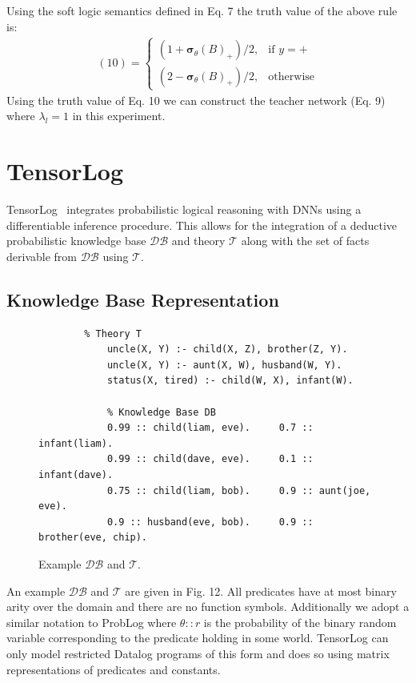 \documentclass[11pt]{article}
\begin{document}
Using the soft logic semantics defined in Eq. 7 the truth value of the above rule is:
\begin{gather*}
(10) = 
\begin{cases}
(1 + \boldsymbol{\sigma}_\theta(B)_+)/2, & \text{if } y = +\\
(2 - \boldsymbol{\sigma}_\theta(B)_+)/2, & \text{otherwise}
\end{cases}
\end{gather*}
Using the truth value of Eq. 10 we can construct the teacher network (Eq. 9) where $\lambda_l = 1$ in this experiment.

\section{TensorLog}
TensorLog~\cite{DBLP:journals/corr/Cohen16b} integrates probabilistic logical reasoning with DNNs using a differentiable inference procedure.  This allows for the integration of a deductive probabilistic knowledge base $\mathcal{DB}$ and theory $\mathcal{T}$ along with the set of facts derivable from $\mathcal{DB}$ using $\mathcal{T}$.

\subsection{Knowledge Base Representation}
\begin{figure}
	\begin{center}
		\begin{verbatim}
		% Theory T
			uncle(X, Y) :- child(X, Z), brother(Z, Y).
			uncle(X, Y) :- aunt(X, W), husband(W, Y).
			status(X, tired) :- child(W, X), infant(W).
			
			% Knowledge Base DB
			0.99 :: child(liam, eve).     0.7 :: infant(liam).
			0.99 :: child(dave, eve).     0.1 :: infant(dave).
			0.75 :: child(liam, bob).     0.9 :: aunt(joe, eve).
			0.9 :: husband(eve, bob).     0.9 :: brother(eve, chip).
		\end{verbatim}
	\end{center}
	\caption{Example $\mathcal{DB}$ and $\mathcal{T}$.}
\end{figure}
An example $\mathcal{DB}$ and $\mathcal{T}$ are given in Fig. 12.  All predicates have at most binary arity over the domain and there are no function symbols.  Additionally we adopt a similar notation to ProbLog where $\theta :: r$ is the probability of the binary random variable corresponding to the predicate holding in some world.  TensorLog can only model restricted Datalog programs of this form and does so using matrix representations of predicates and constants.
\end{document}
